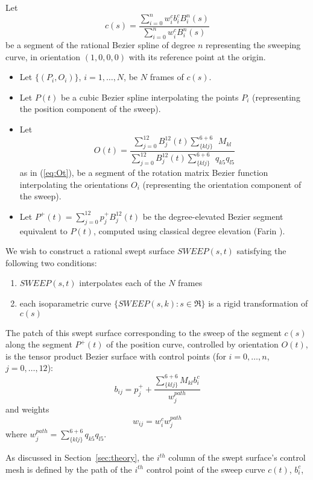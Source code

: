 \begin{theorem}
\label{thm:ten1}
Let
\[
c(s) = \frac{\sum_{i=0}^n w_i^{c} b_i^{c} B_i^n(s)}
	    {\sum_{i=0}^n w_i^{c} B_i^n(s)}
\]
be a segment of the rational Bezier spline of degree $n$
representing the sweeping curve, in orientation $(1,0,0,0)$
with its reference point at the origin.
\begin{itemize}
\item
Let $\{(P_i,O_i)\}$, $i=1,\ldots,N$, be $N$ frames of $c(s)$.
\item
Let $P(t)$ be a cubic Bezier spline interpolating the points $P_i$
(representing the position component of the sweep).
\item
Let 
\[
O(t) = \frac{\sum_{j=0}^{12} B_j^{12}(t) \sum_{\{klj\}}^{6+6}\ \ M_{kl}}
	    {\sum_{j=0}^{12} B_j^{12}(t) \sum_{\{klj\}}^{6+6} \ \ q_{k5}q_{l5}}
\]
as in (\ref{eq:Ot}),
be a segment of the rotation matrix Bezier function
interpolating the orientations $O_i$ 
(representing the orientation component of the sweep).
\item
Let $P^{+}(t) = \sum_{j=0}^{12} p_j^{+} B_j^{12}(t)$
be the degree-elevated Bezier segment equivalent to $P(t)$, 
computed using classical degree elevation (Farin \cite{farin93}).
\end{itemize}

We wish to construct a rational swept surface $SWEEP(s,t)$ satisfying 
the following two conditions:
\begin{enumerate}
\item $SWEEP(s,t)$ interpolates each of the $N$ frames
\item each isoparametric curve $\{SWEEP(s,k) : s \in \Re \}$
	is a rigid transformation of $c(s)$
\end{enumerate}
The patch of this swept surface corresponding to the sweep of the segment
$c(s)$ along the segment $P^{+}(t)$ of the position curve, controlled 
by orientation $O(t)$, is the tensor product Bezier surface with control points
(for $i=0,\ldots,n$, $j=0,\ldots,12$):
\[
b_{ij} = p_j^{+} + \frac{\sum_{\{klj\}}^{6+6} M_{kl} b_i^{c}}{w_j^{path}}
\]
and weights
\[
w_{ij} = w_i^{c}  w_j^{path}
\]
where $w_j^{path} = \sum_{\{klj\}}^{6+6} q_{k5} q_{l5}$.
\end{theorem}
\prf
As discussed in Section~\ref{sec:theory},
the $i^{th}$ column of the swept surface's control mesh is defined by
the path of the $i^{th}$ control point of the sweep curve $c(t)$, $b_i^{c}$, 
